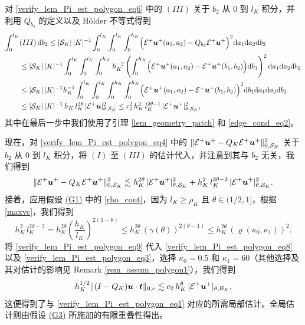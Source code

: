 对 \eqref{verify_lem_Pi_est_polygon_eq6} 中的 $(III)$ 关于 $b_2$ 从 $0$ 到 $l_K$ 积分，并利用 $Q_{b_2}$ 的定义以及 Hölder 不等式得到
{\small
\begin{equation}
\begin{split}
\label{verify_lem_Pi_est_polygon_eq7}
\int_0^{l_K} & (III)\, \mathrm{ d} b_2 \le |\mathcal{S}_K|\, |K|^{-1} \int_0^{l_K} \int_0^{l_K} \int_0^{h_K} \Bigl( \mathcal{E}^+ \boldsymbol{u}^+(a_1,a_2) - Q_{b_2} \mathcal{E}^+ \boldsymbol{u}^+ \Bigr)^2 \mathrm{ d} a_1 \mathrm{ d} a_2 \mathrm{ d} b_2 \\
&\le |\mathcal{S}_K|\, |K|^{-1} \int_0^{l_K} \int_0^{l_K} \int_0^{h_K} h_K^{-2} \left( \int_0^{h_K} \Bigl(\mathcal{E}^+ \boldsymbol{u}^+(a_1,a_2) - \mathcal{E}^+ \boldsymbol{u}^+(b_1,b_2)\Bigr) \mathrm{ d} b_1 \right)^2 \mathrm{ d} a_1 \mathrm{ d} a_2 \mathrm{ d} b_2 \\
&\le |\mathcal{S}_K|\, |K|^{-1} h_K^{-1} \int_0^{l_K} \int_0^{l_K} \int_0^{h_K} \int_0^{h_K} \Bigl(\mathcal{E}^+ \boldsymbol{u}^+(a_1,a_2) - \mathcal{E}^+ \boldsymbol{u}^+(b_1,b_2)\Bigr)^2 \mathrm{ d} b_1 \mathrm{ d} a_1 \mathrm{ d} a_2 \mathrm{ d} b_2 \\
&\le |\mathcal{S}_K|\, |K|^{-1} \, h_K\, l_K^{2\theta} \, | \mathcal{E}^+ \boldsymbol{u} |^2_{\theta,\mathcal{S}_K}
\le c^2_2 \, h_K^2\, l_K^{2\theta-1} \, | \mathcal{E}^+ \boldsymbol{u}^+ |^2_{\theta,\mathcal{S}_K},
\end{split}
\end{equation}
}
其中在最后一步中我们使用了引理 \ref{lem_geometry_patch} 和 \eqref{edge_cond_eq2}。

现在，对 \eqref{verify_lem_Pi_est_polygon_eq4} 中的 $\| \mathcal{E}^+ \boldsymbol{u}^+ - Q_{K} \mathcal{E}^+ \boldsymbol{u}^+ \|^2_{0,\mathcal{S}_K}$ 关于 $b_2$ 从 $0$ 到 $l_K$ 积分，将 $(I)$ 至 $(III)$ 的估计代入，并注意到其与 $b_2$ 无关，我们得到
\begin{equation}
\label{verify_lem_Pi_est_polygon_eq8}
\| \mathcal{E}^+ \boldsymbol{u}^+ - Q_{K} \mathcal{E}^+ \boldsymbol{u}^+ \|^2_{0,\mathcal{S}_K}
\lesssim h_K^{2\theta} \, | \mathcal{E}^+ \boldsymbol{u}^+ |^2_{\theta,\mathcal{S}_K}
+ h_K^2\, l_K^{2\theta-2} \, | \mathcal{E}^+ \boldsymbol{u}^+ |^2_{\theta,\mathcal{S}_K}.
\end{equation}
接着，应用假设 \hyperref[asp:polygonG1]{(G1)} 中的 \eqref{rho_cont}，因为
$l_K\ge\rho_K$ 且 $\theta\in(1/2,1]$，根据 \eqref{maxvc}，我们得到
\begin{equation}
\label{verify_lem_Pi_est_polygon_eq9}
h_K^2\, l_K^{2\theta-2} = h_K^{2\theta} \left(\frac{h_K}{l_K}\right)^{2(1-\theta)}
\le h_K^{2\theta} \, (\gamma(\theta))^{2(\theta-1)}
\le h_K^{2\theta} \, (\varrho(\kappa_0,\kappa_1))^2.
\end{equation}
将 \eqref{verify_lem_Pi_est_polygon_eq9} 代入 \eqref{verify_lem_Pi_est_polygon_eq8} 以及 \eqref{verify_lem_Pi_est_polygon_eq3}，选择 $\kappa_0 = 0.5$ 和 $\kappa_1 = 60$（其他选择及其对估计的影响见 Remark \ref{rem_assum_polygon1}），我们得到
\begin{equation}
\label{verify_lem_Pi_est_polygon_eq10}
h_K^{1/2} \| (I - Q_K)\boldsymbol{u} \cdot \boldsymbol{t} \|_{0,e}
\lesssim c_2 \, h_K^{\theta} \, | \mathcal{E}^+ \boldsymbol{u}^+ |_{\theta,\mathcal{B}_K},
\end{equation}
这便得到了与 \eqref{verify_lem_Pi_est_polygon_eq1} 对应的所需局部估计。全局估计则由假设 \hyperref[asp:polygonG3]{(G3)} 所施加的有限重叠性得出。

